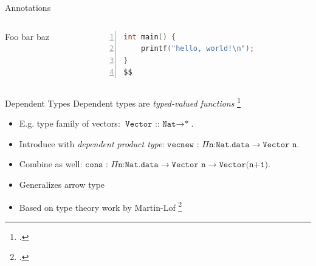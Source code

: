 \documentclass[aspectratio=169]{beamer}
\begin{document}

\begin{frame}[fragile]{Annotations}
  \footnotesize
  \begin{columns}[T]
    \begin{column}{0.45\textwidth}
        Foo bar baz
    \end{column}
    \begin{column}{0.45\textwidth}
%      
       \begin{lstlisting}[language=C,numbers=left,mathescape,basicstyle={\footnotesize\ttfamily}]
int main() {
    printf("hello, world!\n");
}
$$
        \end{lstlisting}
    \end{column}
  \end{columns}
\end{frame}

\begin{frame}{Dependent Types}
    Dependent types are \emph{typed-valued functions} \footcite{pierce_advanced_2005}
    \begin{itemize}
        \item E.g. type family of vectors: $\texttt{Vector :: Nat}\rightarrow\texttt{*}$.
        \item Introduce with \emph{dependent product type}: $\texttt{vecnew : }\Pi\texttt{n:Nat.data}\rightarrow\texttt{Vector n}$.
        \item Combine as well: $\texttt{cons : }\Pi\texttt{n:Nat.data}\rightarrow\texttt{Vector n}\rightarrow\texttt{Vector(n+1)}$.
        \item Generalizes arrow type
        \item Based on type theory work by Martin-Lof \footcite{martin-lof_constructive_1984}
    \end{itemize}
\end{frame}
\end{document}

